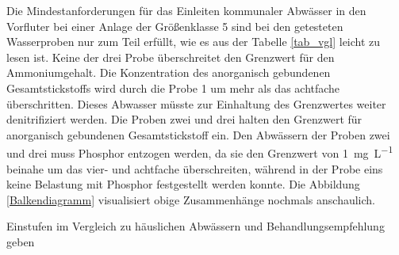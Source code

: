 Die Mindestanforderungen für das Einleiten kommunaler Abwässer in den Vorfluter bei einer Anlage der Größenklasse 5 sind bei den getesteten Wasserproben nur zum Teil erfüllt, wie es aus der Tabelle \ref{tab_vgl} leicht zu lesen ist. Keine der drei Probe überschreitet den Grenzwert für den Ammoniumgehalt. Die Konzentration des anorganisch gebundenen Gesamtstickstoffs wird durch die Probe 1 um mehr als das achtfache überschritten. Dieses Abwasser müsste zur Einhaltung des Grenzwertes weiter denitrifiziert werden. Die Proben zwei und drei halten den Grenzwert für anorganisch gebundenen Gesamtstickstoff ein. Den Abwässern der Proben zwei und drei muss Phosphor entzogen werden, da sie den Grenzwert von \SI{1}{\milli\gram\per\liter} beinahe um das vier- und achtfache überschreiten, während in der Probe eins keine Belastung mit Phosphor festgestellt werden konnte.
Die Abbildung \ref{Balkendiagramm} visualisiert obige Zusammenhänge nochmals anschaulich.


Einstufen im Vergleich zu häuslichen Abwässern und Behandlungsempfehlung geben

